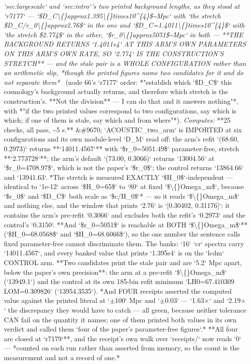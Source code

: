 \begin{description}
\textit{`sec:largescale` and `sec:intro`'s two printed background lengths, as they stood at `r7177` --- `\$D\_C\textbackslash\{\}approx1.395\textbackslash\{\}times10\textasciicircum{}\{4\}\$\textasciitilde{}Mpc` with `the stretch \$D\_C/r\_0\textbackslash\{\}approx2.76\$` in the one and `\$D\_C=1.4011\textbackslash\{\}times10\textasciicircum{}\{4\}\$` with `the stretch \$2.774\$` in the other, `\$r\_0\textbackslash\{\}approx5051\$\textasciitilde{}Mpc` in both ---  **THE BACKGROUND RETURNS `1.4011e4` AT THIS ARM'S OWN PARAMETERS ON THIS ARM'S OWN RATE, SO `2.774` IS THE CONSTRUCTION'S STRETCH** --- and the stale pair is a WHOLE CONFIGURATION rather than an arithmetic slip, *though the printed figures name two candidates for it and do not separate them*} \ (node 66's `r7177` order: *"establish which `\$D\_C\$` this cosmology's background actually returns, and therefore which stretch is the construction's. **Not the division** --- I can do that and it answers nothing"*, with *"if the two printed values correspond to two configurations, say which is which; if one of them is stale, say which and from where"*). 
\emph{Computes:} **25 checks, all pass, \textasciitilde{}5 s.** \&\#9670; `ACOUSTIC\_two\_arm` is IMPORTED at six configurations and its own module-level `D\_M` read off: the arm's refit `(68.60, 0.2973)` returns **`14011.4567`** with `\$r\_0=5051.49\$` parameter-free, stretch **`2.773728`**; the arm's default `(73.00, 0.3066)` returns `13004.56` at `\$r\_0=4708.97\$`, which is not the paper's `\$r\_0\$`; the control returns `13864.66` and `13941.63`.  *The stretch is measured EXACTLY `\$H\_0\$`-independent --- identical to `1e-12` across `\$H\_0=65\$` to `80` at fixed `\$\textbackslash\{\}Omega\_m\$`, because `\$r\_0\$` and `\$D\_C\$` both scale as `\$c/H\_0\$`* --- so it reads `\$\textbackslash\{\}Omega\_m\$` and nothing else, and the window that prints `2.76` is `[0.30402, 0.31176]`: it contains the arm's pre-refit `0.3066` and excludes both the refit's `0.2973` and the control's `0.3150`.  **And `\$r\_0=5051\$` is reachable at BOTH `\$\textbackslash\{\}Omega\_m\$`** (`\$H\_0=68.0568\$` and `\$H\_0=68.6066\$`), so the one number the sentence calls fixed parameter-free cannot discriminate them.  The banks: `16` `cr` spectra carry `14011.4567`, and every banked value that prints `1.395e4` is on the `lcdm` CONTROL arm.  **Two candidates print the stale pair and are `5.2` Mpc apart, below the paper's own precision**: the arm at a pre-refit `\$\textbackslash\{\}Omega\_m\$` (`13949.1`) and the control at its own 185-bin refit minimum `LH0=67.410309 LOM=0.309826` (`13954.3535`).  *And FOUR receipts asserted the computed value against the printed literal at `\ensuremath{\pm}100` Mpc and `\ensuremath{\pm}0.03` --- `1.63\ensuremath{\times}` and `2.19\ensuremath{\times}` the discrepancy they would have to catch --- all green, because neither tolerance CAN fail on the quantity it names; one of them printed both values in its own verdict and called them `four of the paper's parameter-free figures`.*  **All four are closed at `r7179`**, and the receipt's own walk over `receipts/` now reads `0` --- *counted on each run rather than asserted from memory, so the count is the measurement and not a record of one.*

\end{description}
